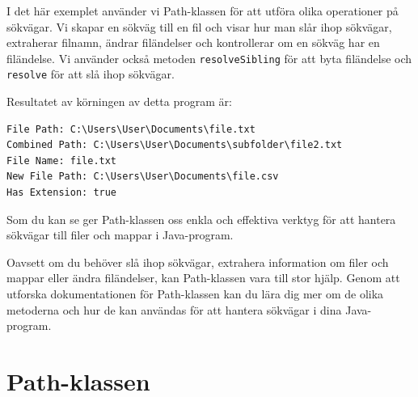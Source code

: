\begin{Shaded}
\begin{Highlighting}[]
        \OperatorTok{(} \OperatorTok{+}\OperatorTok{);}
        \OperatorTok{(} \OperatorTok{+}\OperatorTok{);}
        \OperatorTok{(} \OperatorTok{+}\OperatorTok{);}
        \OperatorTok{(} \OperatorTok{+}\OperatorTok{);}
        \OperatorTok{(} \OperatorTok{+}\OperatorTok{);}
    \OperatorTok{\}}
\OperatorTok{\}}
\end{Highlighting}
\end{Shaded}

I det här exemplet använder vi Path-klassen för att utföra olika
operationer på sökvägar. Vi skapar en sökväg till en fil och visar hur
man slår ihop sökvägar, extraherar filnamn, ändrar filändelser och
kontrollerar om en sökväg har en filändelse. Vi använder också metoden
\texttt{resolveSibling} för att byta filändelse och \texttt{resolve} för
att slå ihop sökvägar.

Resultatet av körningen av detta program är:

\begin{verbatim}
File Path: C:\Users\User\Documents\file.txt
Combined Path: C:\Users\User\Documents\subfolder\file2.txt
File Name: file.txt
New File Path: C:\Users\User\Documents\file.csv
Has Extension: true
\end{verbatim}

Som du kan se ger Path-klassen oss enkla och effektiva verktyg för att
hantera sökvägar till filer och mappar i Java-program.

Oavsett om du behöver slå ihop sökvägar, extrahera information om filer
och mappar eller ändra filändelser, kan Path-klassen vara till stor
hjälp. Genom att utforska dokumentationen för Path-klassen kan du lära
dig mer om de olika metoderna och hur de kan användas för att hantera
sökvägar i dina Java-program.

\hypertarget{path-klassen}{%
\section{Path-klassen}\label{path-klassen}}

